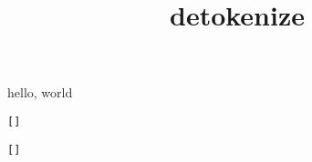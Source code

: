 \documentclass{amsart}
\title{detokenize}
\begin{document}
\maketitle

hello, world

\def\X{\fafkl $_&o^}


\texttt{\detokenize\expandafter{\X}}

\texttt{}

\texttt{\detokenize{\fafkl {} $_&^}}

\texttt{[]}

\texttt{[\detokenize{\A\B\C}]}

\edef\X{\detokenize{\fafkl {} $_&^}}

{\tt\meaning\X}
\end{document}
